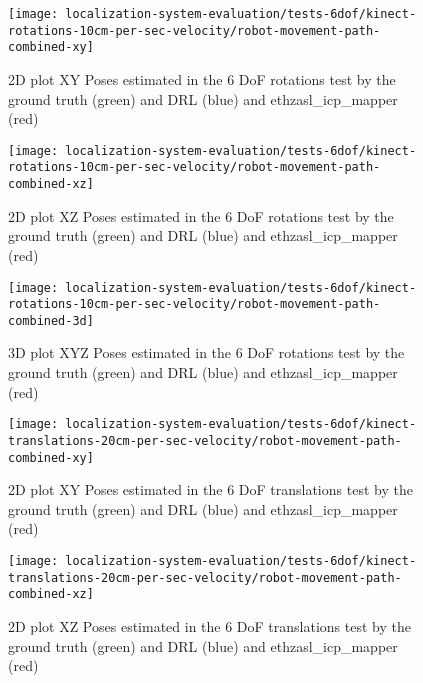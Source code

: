 \begin{figure}[H]
	\centering
	\texttt{[image: localization-system-evaluation/tests-6dof/kinect-rotations-10cm-per-sec-velocity/robot-movement-path-combined-xy]}
	\caption{2D plot XY Poses estimated in the 6 DoF rotations test by the ground truth (green) and DRL (blue) and ethzasl\_icp\_mapper (red)}
	\label{fig:localization-system-evaluation_kinect-rotations-robot-movement-path-combined-xy}
\end{figure}

\begin{figure}[H]
	\centering
	\texttt{[image: localization-system-evaluation/tests-6dof/kinect-rotations-10cm-per-sec-velocity/robot-movement-path-combined-xz]}
	\caption{2D plot XZ Poses estimated in the 6 DoF rotations test by the ground truth (green) and DRL (blue) and ethzasl\_icp\_mapper (red)}
	\label{fig:localization-system-evaluation_kinect-rotations-robot-movement-path-combined-xz}
\end{figure}

\begin{figure}[H]
	\centering
	\texttt{[image: localization-system-evaluation/tests-6dof/kinect-rotations-10cm-per-sec-velocity/robot-movement-path-combined-3d]}
	\caption{3D plot XYZ Poses estimated in the 6 DoF rotations test by the ground truth (green) and DRL (blue) and ethzasl\_icp\_mapper (red)}
	\label{fig:localization-system-evaluation_kinect-rotations-robot-movement-path-combined-3d}
\end{figure}


\begin{figure}[H]
	\centering
	\texttt{[image: localization-system-evaluation/tests-6dof/kinect-translations-20cm-per-sec-velocity/robot-movement-path-combined-xy]}
	\caption{2D plot XY Poses estimated in the 6 DoF translations test by the ground truth (green) and DRL (blue) and ethzasl\_icp\_mapper (red)}
	\label{fig:localization-system-evaluation_kinect-translations-robot-movement-path-combined-xy}
\end{figure}

\begin{figure}[H]
	\centering
	\texttt{[image: localization-system-evaluation/tests-6dof/kinect-translations-20cm-per-sec-velocity/robot-movement-path-combined-xz]}
	\caption{2D plot XZ Poses estimated in the 6 DoF translations test by the ground truth (green) and DRL (blue) and ethzasl\_icp\_mapper (red)}
	\label{fig:localization-system-evaluation_kinect-translations-robot-movement-path-combined-xz}
\end{figure}

